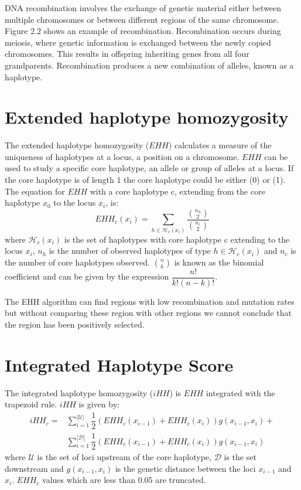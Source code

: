 \documentclass[a4paper,12pt]{report}
\begin{document}
DNA recombination involves the exchange of genetic material either between multiple chromosomes or between different regions of the same chromosome. Figure 2.2 shows an example of recombination. Recombination occurs during meiosis, where genetic information is exchanged between the newly copied chromosomes. This results in offspring inheriting genes from all four grandparents. Recombination produces a new combination of alleles, known as a haplotype.

\section{Extended haplotype homozygosity}

The extended haplotype homozygosity ($EHH$) calculates a measure of the uniqueness of haplotypes at a locus, a position on a chromosome. $EHH$ can be used to study a specific core haplotype, an allele or group of alleles at a locus. If the core haplotype is of length 1 the core haplotype could be either (0) or (1). The equation for $EHH$ with a core haplotype c, extending from the core haplotype $x_0$ to the locus $x_i$, is:
\begin{equation}
EHH_c(x_i) = \sum_{h\in\mathcal{H}_c(x_i)}\dfrac{\binom{n_h}{2}}{\binom{n_c}{2}}
\end{equation}
where $\mathcal{H}_c(x_i)$ is the set of haplotypes with core haplotype c extending to the locus $x_i$, $n_h$ is  the number of observed haplotypes of type $h\in\mathcal{H}_c(x_i)$ and $n_c$ is the number of core haplotypes observed.\cite{EHH}  $\binom{n}{k}$ is known as the binomial coefficient and can be given by the expression $\dfrac{n!}{k!(n-k)!}$.

The EHH algorithm can find regions with low recombination and mutation rates but without comparing these region with other regions we cannot conclude that the region has been positively selected.

\section{Integrated Haplotype Score}

The integrated haplotype homozygosity ($iHH$) is $EHH$ integrated with the trapezoid rule. $iHH$ is given by:
\begin{equation}
\begin{split}
iHH_c = &\sum_{i=1}^{|\mathcal{U}|}\dfrac{1}{2}(EHH_c(x_{i-1})+EHH_c(x_i))g(x_{i-1},x_i)+\\
&\sum_{i=1}^{|\mathcal{D}|}\dfrac{1}{2}(EHH_c(x_{i-1})+EHH_c(x_i))g(x_{i-1},x_i)
\end{split}
\end{equation}
where $\mathcal{U}$ is the set of loci upstream of the core haplotype, $\mathcal{D}$ is the set downstream and $g(x_{i-1},x_i)$ is the genetic distance between the loci $x_{i-1}$ and $x_i$. $EHH_c$ values which are less than 0.05 are truncated.
\end{document}
